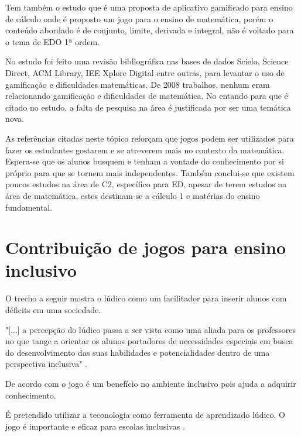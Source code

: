 Tem também o estudo \cite{appcalculo} que é uma proposta de aplicativo gamificado para ensino de cálculo onde é proposto um jogo para o ensino de matemática, porém o conteúdo abordado é de conjunto, limite, derivada e integral, não é voltado para o tema de EDO 1ª ordem.

No estudo \cite{revbibmatgam} foi feito uma revisão bibliográfica nas bases de dados Scielo, Science Direct, ACM Library, IEE Xplore Digital entre outras, para levantar o uso de gamificação e dificuldades matemáticas. De 2008 trabalhos, nenhum eram relacionando gamificação e dificuldades de matemática. No entando para \cite{dicheva} que é citado no estudo, a falta de pesquisa na área é justificada por ser uma temática nova.

As referências citadas neste tópico reforçam que jogos podem ser utilizados para fazer os estudantes gostarem e se atreverem mais no contexto da matemática. Espera-se que os alunos busquem e tenham a vontade do conhecimento por si próprio para que se tornem mais independentes. Também conclui-se que existem poucos estudos na área de C2, específico para ED, apesar de terem estudos na área de matemática, estes destinam-se a cálculo 1 e matérias do ensino fundamental.

\section[Contribuição de jogos para ensino inclusivo]{Contribuição de jogos para ensino inclusivo}

O trecho a seguir mostra o lúdico como um facilitador para inserir alunos com déficits em uma sociedade. 

"[...] a percepção do lúdico passa a ser vista como uma aliada para os professores no que tange a orientar os alunos portadores de necessidades especiais em busca do desenvolvimento das suas habilidades e potencialidades dentro de uma perspectiva inclusiva"  \cite{jogoPratPedagoc}.

De acordo com \cite{jogoPratPedagoc} o jogo é um benefício no ambiente inclusivo pois ajuda a adquirir conhecimento.

É pretendido utilizar a teconologia como ferramenta de aprendizado lúdico. O jogo é importante e eficaz para escolas inclusivas \cite{jogoPratPedagoc}.

